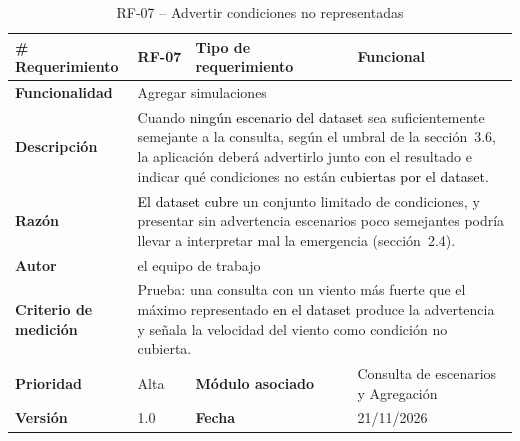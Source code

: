 \begin{longtable}{|p{\rqA}|p{\rqB}|p{\rqC}|p{\rqD}|}
  \caption{RF-07 -- Advertir condiciones no representadas}\label{tab:rf-07}\tabularnewline
  \hline
  \textbf{\# Requerimiento} & RF-07 & \raggedright\textbf{Tipo de requerimiento} & Funcional\tabularnewline\hline
  \raggedright\textbf{Funcionalidad} & \multicolumn{3}{p{\rqBCD}|}{Agregar simulaciones}\tabularnewline\hline
  \endfirsthead
  \textbf{Descripción} & \multicolumn{3}{p{\rqBCD}|}{Cuando \textcolor{black}{ningún escenario del dataset} sea suficientemente semejante a la consulta, según el umbral de la sección~3.6, la aplicación deberá advertirlo junto con el resultado e indicar qué condiciones no están \textcolor{black}{cubiertas por el dataset}.}\tabularnewline\hline
  \textbf{Razón} & \multicolumn{3}{p{\rqBCD}|}{\textcolor{black}{El dataset cubre} un conjunto limitado de condiciones, y presentar sin advertencia escenarios poco semejantes podría llevar a interpretar mal la emergencia (sección~2.4).}\tabularnewline\hline
  \textbf{Autor} & \multicolumn{3}{p{\rqBCD}|}{el equipo de trabajo}\tabularnewline\hline
  \raggedright\textbf{Criterio de medición} & \multicolumn{3}{p{\rqBCD}|}{Prueba: una consulta con un viento más fuerte que el máximo representado \textcolor{black}{en el dataset} produce la advertencia y señala la velocidad del viento como condición no cubierta.}\tabularnewline\hline
  \textbf{Prioridad} & Alta & \raggedright\textbf{Módulo asociado} & Consulta de escenarios y Agregación\tabularnewline\hline
  \textbf{Versión} & 1.0 & \textbf{Fecha} & 21/11/2026\tabularnewline\hline
\end{longtable}

